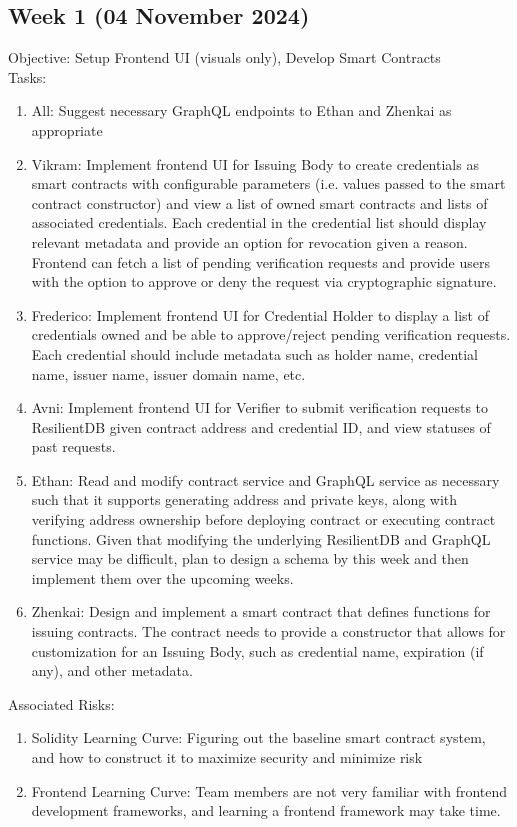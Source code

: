\subsection{Week 1 (04 November 2024)}
Objective: Setup Frontend UI (visuals only), Develop Smart Contracts \\
Tasks: 
\begin{enumerate}
    \item All: Suggest necessary GraphQL endpoints to Ethan and Zhenkai as appropriate
    \item Vikram: Implement frontend UI for Issuing Body to create credentials as smart contracts with configurable parameters (i.e. values passed to the smart contract constructor) and view a list of owned smart contracts and lists of associated credentials. Each credential in the credential list should display relevant metadata and provide an option for revocation given a reason. Frontend can fetch a list of pending verification requests and provide users with the option to approve or deny the request via cryptographic signature.
    \item Frederico: Implement frontend UI for Credential Holder to display a list of credentials owned and be able to approve/reject pending verification requests. Each credential should include metadata such as holder name, credential name, issuer name, issuer domain name, etc.
    \item Avni: Implement frontend UI for Verifier to submit verification requests to ResilientDB given contract address and credential ID, and view statuses of past requests.
    \item Ethan: Read and modify contract service and GraphQL service as necessary such that it supports generating
    address and private keys, along with verifying address ownership before deploying contract or executing contract functions.
    Given that modifying the underlying ResilientDB and GraphQL service may be difficult, plan to
    design a schema by this week and then implement them over the upcoming weeks.
    \item Zhenkai: Design and implement a smart contract that defines functions for issuing contracts. The contract needs to provide a constructor that allows for customization for an Issuing Body, such as credential name, expiration (if any), and other metadata.
\end{enumerate}
Associated Risks:
\begin{enumerate}
    \item Solidity Learning Curve: Figuring out the baseline smart contract system, and how to construct it to maximize security and minimize risk
    \item Frontend Learning Curve: Team members are not very familiar with frontend development frameworks, and learning a frontend framework may take time.
\end{enumerate}

